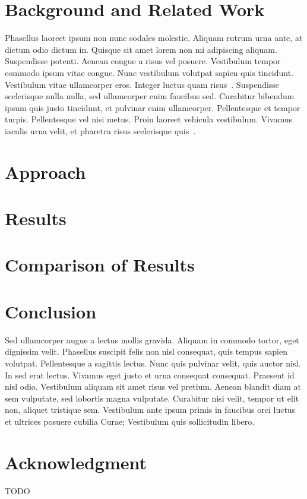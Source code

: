 \documentclass[10pt, conference]{IEEEtran}
\begin{document}
\section{Background and Related Work}
\label{sec:backgr-relat-work}

Phasellus laoreet ipsum non nunc sodales molestie. Aliquam rutrum urna ante, at dictum odio dictum in. Quisque sit amet lorem non mi adipiscing aliquam. Suspendisse potenti. Aenean congue a risus vel posuere. Vestibulum tempor commodo ipsum vitae congue. Nunc vestibulum volutpat sapien quis tincidunt. Vestibulum vitae ullamcorper eros. Integer luctus quam risus~\cite{humble10}. Suspendisse scelerisque nulla nulla, sed ullamcorper enim faucibus sed. Curabitur bibendum ipsum quis justo tincidunt, et pulvinar enim ullamcorper. Pellentesque et tempor turpis. Pellentesque vel nisi metus. Proin laoreet vehicula vestibulum. Vivamus iaculis urna velit, et pharetra risus scelerisque quis~\cite{baysal11}.

\section{Approach}
\label{sec:approach}

\section{Results}
\label{sec:results}

\section{Comparison of Results}
\label{sec:comparison-results}

\section{Conclusion}
\label{sec:conclusion}

Sed ullamcorper augue a lectus mollis gravida. Aliquam in commodo tortor, eget dignissim velit. Phasellus suscipit felis non nisl consequat, quis tempus sapien volutpat. Pellentesque a sagittis lectus. Nunc quis pulvinar velit, quis auctor nisl. In sed erat lectus. Vivamus eget justo et urna consequat consequat. Praesent id nisl odio. Vestibulum aliquam sit amet risus vel pretium. Aenean blandit diam at sem vulputate, sed lobortis magna vulputate. Curabitur nisi velit, tempor ut elit non, aliquet tristique sem. Vestibulum ante ipsum primis in faucibus orci luctus et ultrices posuere cubilia Curae; Vestibulum quis sollicitudin libero.

\section*{Acknowledgment}
TODO

\balance


\end{document}
